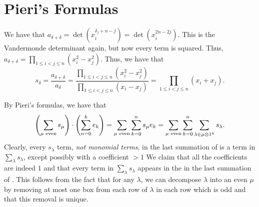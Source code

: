 \documentclass[letterpaper, 11pt, oneside]{book}
\begin{document}
\clearpage

\section{Pieri's Formulas}

\begin{sol}\label{ex:Manivel_1.2.4}
  We have that $a_{\delta + \delta} = \det(x_{i}^{\delta_{j} + n - j}) = \det(x_{i}^{2n - 2j})$.
  This is the Vandermonde determinant again, but now every term is squared.
  Thus, $a_{\delta + \delta} = \prod_{1 \leq i < j \leq n} (x_{i}^{2} - x_{j}^{2})$.
  Thus, we have that
  \[
    s_{\delta} = \frac{a_{\delta + \delta}}{a_{\delta}} = \frac{\prod_{1 \leq i < j \leq n} (x_{i}^{2} - x_{j}^{2})}{\prod_{1 \leq i < j \leq n} (x_{i} - x_{j})} = \prod_{1 \leq i < j \leq n} (x_{i} + x_{j}).
  \]
\end{sol}

\begin{sol}\label{ex:Manivel_1.2.7}
  By Pieri's formulas, we have that
  \begin{equation}\label{eq:Pieri_even_expansion}
    \pqty{\sum_{\mu \text{ even}} s_{\mu}} \cdot \pqty{\sum_{n = 0}^{k} e_{k}} = \sum_{\mu \text{ even}} \sum_{k = 0}^{n} s_{\mu} e_{k} = \sum_{\mu \text{ even}} \sum_{k = 0}^{n} \sum_{\lambda \in \mu \otimes 1^{k}} s_{\lambda}.
  \end{equation}
  Clearly, every $s_{\lambda}$ term, \emph{not monomial terms}, in the last summation of  is a term in $\sum_{\lambda} s_{\lambda}$, except possibly with a coefficient $> 1$
  We claim that all the coefficients are indeed $1$ and that every term in $\sum_{\lambda} s_{\lambda}$ appears in the in the last summation of .
  This follows from the fact that for any $\lambda$, we can decompose $\lambda$ into an even $\mu$ by removing at most one box from each row of $\lambda$ in each row which is odd and that this removal is unique.
\end{sol}

\printbibliography
\end{document}
